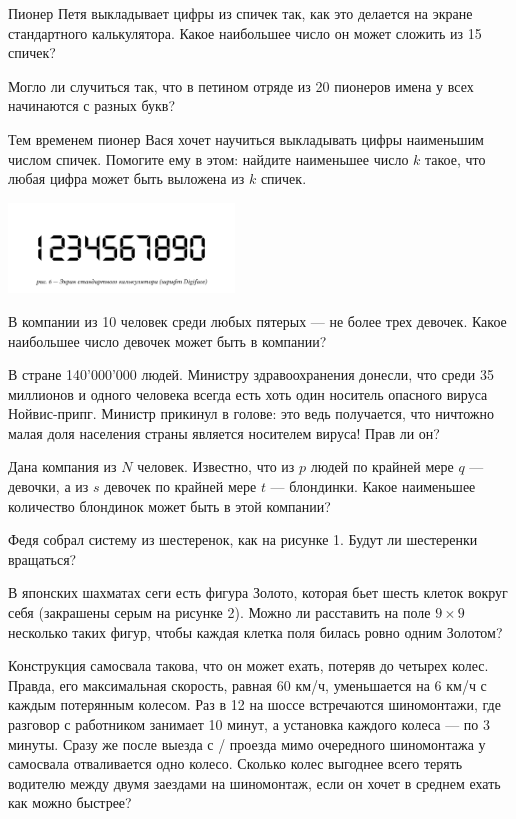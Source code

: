 \begin{itemize}
\itA Пионер Петя выкладывает цифры из спичек так, как это делается на экране стандартного калькулятора. Какое наибольшее число он может сложить из 15 спичек?

\itB Могло ли случиться так, что в петином отряде из 20 пионеров имена у всех начинаются с разных букв?

\itC Тем временем пионер Вася хочет научиться выкладывать цифры наименьшим числом спичек. Помогите ему в этом: найдите наименьшее число $k$ такое, что любая цифра может быть выложена из $k$ спичек. 
\end{itemize}

\begin{center}
  \includegraphics[width=6cm]{stats/2016/Figures/Digiface.png}
\end{center}

\begin{itemize}
\itA В компании из 10 человек среди любых пятерых — не более трех девочек. Какое наибольшее число девочек может быть в компании?

\itB В стране 140'000'000 людей. Министру здравоохранения донесли, что среди 35 миллионов и одного человека всегда есть хоть один носитель опасного вируса Нойвис-припг. Министр прикинул в голове: это ведь получается, что ничтожно малая доля населения страны является носителем вируса! Прав ли он?

\itC Дана компания из $N$ человек. Известно, что из $p$ людей по крайней мере $q$ --- девочки, а из $s$ девочек по крайней мере $t$ --- блондинки. Какое наименьшее количество блондинок может быть в этой компании?
\end{itemize}

\begin{itemize}
\itA Федя собрал систему из шестеренок, как на рисунке 1. Будут ли шестеренки вращаться?

\itB В японских шахматах сеги есть фигура Золото, которая бьет шесть клеток вокруг себя (закрашены серым на рисунке 2). Можно ли расставить на поле $9 \times 9$ несколько таких фигур, чтобы каждая клетка поля билась ровно одним Золотом?

\itC Конструкция самосвала такова, что он может ехать, потеряв до четырех колес. Правда, его максимальная скорость, равная 60 км/ч, уменьшается на 6 км/ч с каждым потерянным колесом. Раз в \SI{12}{} на шоссе встречаются шиномонтажи, где разговор с работником занимает 10 минут, а установка каждого колеса — по 3 минуты. Сразу же после выезда с / проезда мимо очередного шиномонтажа у самосвала отваливается одно колесо. Сколько колес выгоднее всего терять водителю между двумя заездами на шиномонтаж, если он хочет в среднем ехать как можно быстрее?
\end{itemize}

